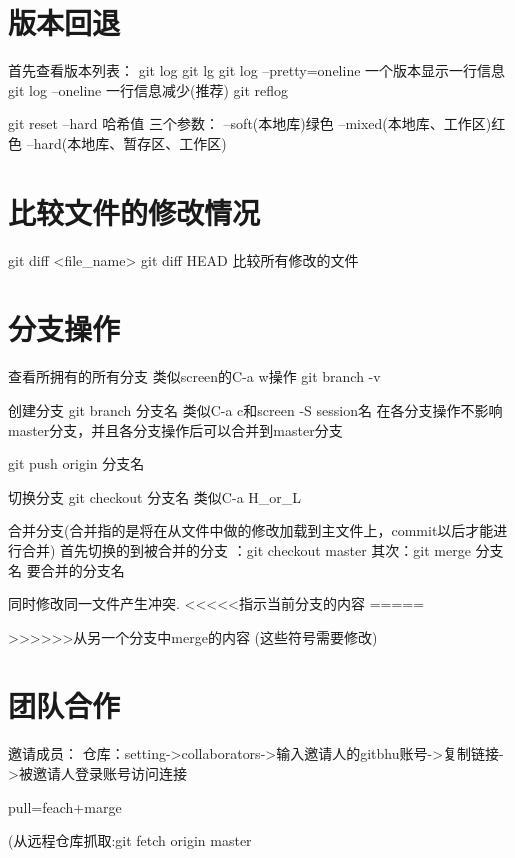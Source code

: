 \documentclass{article}
\begin{document}
        \section{版本回退}
        首先查看版本列表：
        git log
        git lg
        git log --pretty=oneline 一个版本显示一行信息
        git log --oneline 一行信息减少(推荐)
        git reflog

        git reset --hard 哈希值
          三个参数：
          --soft(本地库)绿色
          --mixed(本地库、工作区)红色
          --hard(本地库、暂存区、工作区)

          \section{比较文件的修改情况}
          git diff <file\_name>
          git diff HEAD 比较所有修改的文件

          \section{分支操作}
          查看所拥有的所有分支 类似screen的C-a w操作
          git branch -v

          创建分支
          git branch 分支名 类似C-a c和screen -S session名
          在各分支操作不影响master分支，并且各分支操作后可以合并到master分支

          git push origin 分支名
          
          切换分支
          git checkout 分支名 类似C-a H\_or\_L

          合并分支(合并指的是将在从文件中做的修改加载到主文件上，commit以后才能进行合并)
          首先切换的到被合并的分支 ：git checkout master
          其次：git merge 分支名  要合并的分支名

          同时修改同一文件产生冲突.
          <<<<<指示当前分支的内容
          =====

          >>>>>>从另一个分支中merge的内容
          (这些符号需要修改)

          \section{团队合作}
          邀请成员：
          仓库：setting->collaborators->输入邀请人的gitbhu账号->复制链接->被邀请人登录账号访问连接

          pull=feach+marge
          
          (从远程仓库抓取:git fetch origin master
          
\end{document}
